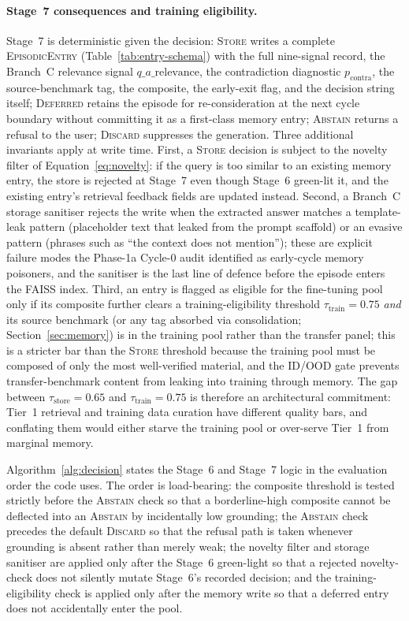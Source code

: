\paragraph{Stage~7 consequences and training eligibility.}
Stage~7 is deterministic given the decision: \textsc{Store} writes a complete \textsc{EpisodicEntry} (Table~\ref{tab:entry-schema}) with the full nine-signal record, the Branch~C relevance signal $q\_a\_\text{relevance}$, the contradiction diagnostic $p_{\text{contra}}$, the source-benchmark tag, the composite, the early-exit flag, and the decision string itself; \textsc{Deferred} retains the episode for re-consideration at the next cycle boundary without committing it as a first-class memory entry; \textsc{Abstain} returns a refusal to the user; \textsc{Discard} suppresses the generation. Three additional invariants apply at write time. First, a \textsc{Store} decision is subject to the novelty filter of Equation~\ref{eq:novelty}: if the query is too similar to an existing memory entry, the store is rejected at Stage~7 even though Stage~6 green-lit it, and the existing entry's retrieval feedback fields are updated instead. Second, a Branch~C storage sanitiser rejects the write when the extracted answer matches a template-leak pattern (placeholder text that leaked from the prompt scaffold) or an evasive pattern (phrases such as ``the context does not mention''); these are explicit failure modes the Phase-1a Cycle-0 audit identified as early-cycle memory poisoners, and the sanitiser is the last line of defence before the episode enters the FAISS index. Third, an entry is flagged as eligible for the fine-tuning pool only if its composite further clears a training-eligibility threshold $\tau_{\text{train}} = 0.75$ \emph{and} its source benchmark (or any tag absorbed via consolidation; Section~\ref{sec:memory}) is in the training pool rather than the transfer panel; this is a stricter bar than the \textsc{Store} threshold because the training pool must be composed of only the most well-verified material, and the ID/OOD gate prevents transfer-benchmark content from leaking into training through memory. The gap between $\tau_{\text{store}} = 0.65$ and $\tau_{\text{train}} = 0.75$ is therefore an architectural commitment: Tier~1 retrieval and training data curation have different quality bars, and conflating them would either starve the training pool or over-serve Tier~1 from marginal memory.

Algorithm~\ref{alg:decision} states the Stage~6 and Stage~7 logic in the evaluation order the code uses. The order is load-bearing: the composite threshold is tested strictly before the \textsc{Abstain} check so that a borderline-high composite cannot be deflected into an \textsc{Abstain} by incidentally low grounding; the \textsc{Abstain} check precedes the default \textsc{Discard} so that the refusal path is taken whenever grounding is absent rather than merely weak; the novelty filter and storage sanitiser are applied only after the Stage~6 green-light so that a rejected novelty-check does not silently mutate Stage~6's recorded decision; and the training-eligibility check is applied only after the memory write so that a deferred entry does not accidentally enter the pool.

